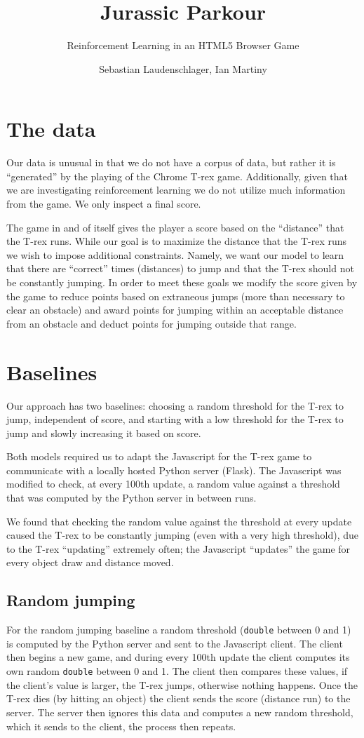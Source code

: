 \documentclass{scrartcl}
\title{Jurassic Parkour}
\subtitle{Reinforcement Learning in an HTML5 Browser Game}
\author{Sebastian Laudenschlager, Ian Martiny}
\begin{document}
\maketitle

\section{The data}

Our data is unusual in that we do not have a corpus of data, but rather it is
``generated'' by the playing of the Chrome T-rex game. Additionally, given that
we are investigating reinforcement learning we do not utilize much information
from the game. We only inspect a final score.

The game in and of itself gives the player a score based on the ``distance''
that the T-rex runs. While our goal is to maximize the distance that the T-rex
runs we wish to impose additional constraints. Namely, we want our model to
learn that there are ``correct'' times (distances) to jump and that the T-rex 
should not be constantly jumping. In order to meet these goals we modify the
score given by the game to reduce points based on extraneous jumps (more than
necessary to clear an obstacle) and award points for jumping within an
acceptable distance from an obstacle and deduct points for jumping outside that
range.

\section{Baselines}

Our approach has two baselines: choosing a random threshold for the T-rex to
jump, independent of score, and starting with a low threshold for the T-rex to
jump and slowly increasing it based on score.

Both models required us to adapt the Javascript for the T-rex game to
communicate with a locally hosted Python server (Flask). The Javascript was
modified to check, at every 100th update, a random value against a threshold
that was computed by the Python server in between runs.

We found that checking the random value against the threshold at every update
caused the T-rex to be constantly jumping (even with a very high threshold), due
to the T-rex ``updating'' extremely often; the Javascript ``updates'' the game for every object draw and distance moved.

\subsection{Random jumping}
For the random jumping baseline a random threshold (\texttt{double} between 0
and 1) is computed by the Python server and sent to the Javascript client. The
client then begins a new game, and during every 100th update the client computes
its own random \texttt{double} between 0 and 1. The client then compares these
values, if the client's value is larger, the T-rex jumps, otherwise nothing
happens. Once the T-rex dies (by hitting an object) the client sends the score
(distance run) to the server. The server then ignores this data and computes a
new random threshold, which it sends to the client, the process then repeats.
\end{document}
